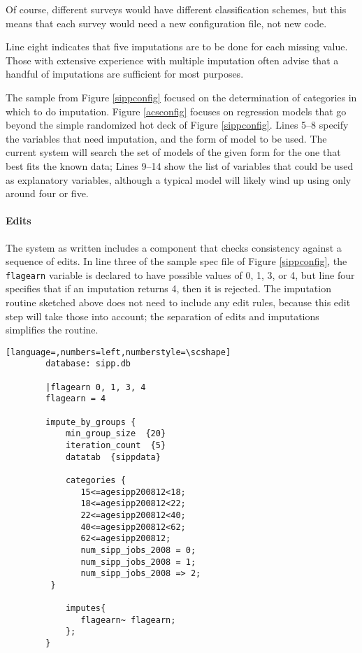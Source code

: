 \documentclass{article}
\begin{document}
        Of course, different surveys would have different classification schemes, but
        this means that each survey would need a new configuration file, not new code.

        Line eight indicates that five imputations are to be done for each missing
        value. Those with extensive experience with multiple imputation often advise
        that a handful of imputations are sufficient for most purposes.

        The sample from
        Figure \ref{sippconfig} focused on the determination of categories in which to
        do imputation. Figure \ref{acsconfig} focuses on regression models that go
        beyond the simple randomized hot deck of Figure \ref{sippconfig}. Lines 5--8
        specify the variables that need imputation, and the form of model to be used.
        The current system will search the set of models of the given form for the one
        that best fits the known data; Lines 9--14 show the list of variables that could be
        used as explanatory variables, although a typical model will likely wind up
        using only around four or five.

     \paragraph{Edits} The system as written includes a component that checks consistency
        against a sequence of edits. In line three of the sample spec file of Figure
        \ref{sippconfig}, the {\tt flagearn} variable is declared to have possible values of 0,
        1, 3, or 4, but line four specifies that if an imputation returns 4, then it is rejected.
        The imputation routine sketched above does not need to include any edit rules, because
        this edit step will take those into account; the separation of edits and imputations
        simplifies the routine.
        \begin{lstlisting}[language=,numbers=left,numberstyle=\scshape]
        database: sipp.db

        |flagearn 0, 1, 3, 4
        flagearn = 4

        impute_by_groups {
            min_group_size  {20}
            iteration_count  {5}
            datatab  {sippdata}

            categories {
               15<=agesipp200812<18;
               18<=agesipp200812<22;
               22<=agesipp200812<40;
               40<=agesipp200812<62;
               62<=agesipp200812;
               num_sipp_jobs_2008 = 0;
               num_sipp_jobs_2008 = 1;
               num_sipp_jobs_2008 => 2;
         }

            imputes{
               flagearn~ flagearn;
            };
        }
        \end{lstlisting}
\end{document}
